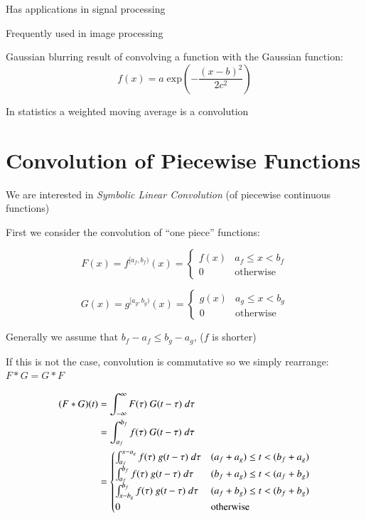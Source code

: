 Has applications in signal processing

Frequently used in image processing

  Gaussian blurring result of convolving a function with the Gaussian function:
\begin{equation}
	f(x) = a \; \text{exp} \left( - \frac{(x-b)^2}{2c^2} \right)
\end{equation}

In statistics a weighted moving average is a convolution

\section{Convolution of Piecewise Functions}

We are interested in \emph{Symbolic Linear Convolution} (of piecewise continuous functions)

First we consider the convolution of ``one piece'' functions:

\begin{equation}
	F(x)=f^{[a_f,b_f)}(x) = 
		\begin{cases}
			f(x) & a_f \leq x < b_f \\
			0 & \text{otherwise}
		\end{cases}
\end{equation}

\begin{equation}
	G(x)=g^{[a_g,b_g)}(x) = 
		\begin{cases}
			g(x) & a_g \leq x < b_g \\
			0 & \text{otherwise}
		\end{cases}
\end{equation}

Generally we assume that $b_f - a_f \leq b_g - a_g$, ($f$ is shorter)

If this is not the case, convolution is commutative so we simply rearrange: $F * G = G * F$

\begin{align}
	(F*G)(t) 
	&= \int_{-\infty}^\infty F(\tau)\; G(t-\tau) \; d\tau \notag \\
	&= \int_{a_f}^{b_f} f(\tau) \; G(t-\tau) \; d\tau \notag \\
	&= 	\begin{cases}
			\int_{a_f}^{x-a_g} f(\tau) \; g(t-\tau) \; d\tau 	& (a_f+a_g) \leq t < (b_f+a_g) \\
			\int_{a_f}^{b_f} f(\tau) \; g(t-\tau) \; d\tau		& (b_f+a_g) \leq t < (a_f+b_g) \\
			\int_{x-b_g}^{b_f} f(\tau) \; g(t-\tau) \; d\tau	& (a_f+b_g) \leq t < (b_f+b_g) \\
			0										& \text{otherwise}
		\end{cases}
\end{align}


